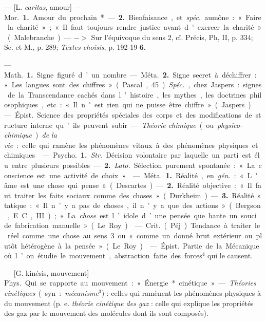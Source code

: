 \begin{itemize}[leftmargin=1cm, label=, itemsep=11pt]
 — [L. {\it caritas}, amour] — \si{Mor.} {\bf 1.}
Amour du prochain*. — {\bf 2.} Bienfaisance, et  {\it spéc.} aumône : « Faire la
charité »; « Il faut toujours rendre
justice avant d'exercer la charité »
(Malebranche). — $->$ Sur l'équivoque du sens 2, cî. Précis, Ph, II,
p. 334; Se. et M., p. 289; {\it Textes
choisis}, p. 192-19 {\bf 6.}

 — \si{Math.} {\bf 1.} Signe figuré d’un
nombre. — \si{Méta.} {\bf 2.} Signe secret à
déchiffrer : « Les langues sont des
chiffres » (Pascal, 45). {\it Spéc.}, chez
Jaspers : signes de la Transcendance
cachés dans l’histoire, les mythes,
les doctrines philosophiques, etc. :
« Il n'est rien qui ne puisse être
chiffre » (Jaspers).

 — \si{Épist.} Science des propriétés spéciales des corps et des
modifications de structure interne
qu'ils peuvent subir. — {\it Théorie
chimique} (ou {\it physico-chimique}) {\it de
la vie} : celle qui ramène les phénomènes vitaux à des phénomènes
physiques et chimiques.

 — \si{Psycho.} {\bf 1.}  {\it Str.} Décision volontaire par laquelle un parti est élu
entre plusieurs possibles. — {\bf 2.}  {\it Lato.}
Sélection purement spontanée :
« La conscience est une activité de
choix ».

 — \si{Méta.} {\bf 1.} Réalité, en  {\it gén.} :
« L'âme est une chose qui pense »
(Descartes). — {\bf 2.} Réalité objective :
« Il faut traiter les faits sociaux
comme des choses » (Durkheim). —
 {\bf 3.} Réalité statique : « Il n’y a pas
de choses, il n’y a que des actions »
(Bergson, E. C., III); « La {\it chose} est
l’idole d’une pensée que hante un
souci de fabrication manuelle »
(Le Roy).

 — \si{Crit.} (Péj.). Tendance à
traiter le réel comme une chose au
sens 3 ou « comme un donné brut
extérieur ou plutôt hétérogène à la
pensée » (Le Roy).

 — \si{Épist.} Partie de la
Mécanique où l’on étudie le mouvement, abstraction faite des forces$^4$
qui le causent.

 — [G. kinésis, mouvement] —
\si{Phys.} Qui se rapporte au mouvement : « Énergie* cinétique ». —
{\it Théories cinétiques} (syn. : {\it mécanisme}$^3$) : celles qui ramènent les
phénomènes physiques à du mouvement (p. e. {\it théorie cinétique des gaz} :
celle qui explique les propriétés des
gaz par le mouvement des molécules
dont ils sont composés).


\end{itemize}
